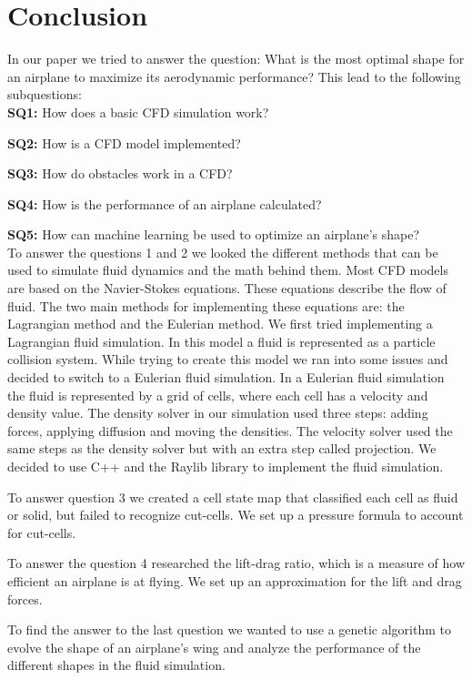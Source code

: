 \documentclass[a4paper,12pt,titlepage]{article}
\begin{document}
\pagebreak
\section{Conclusion}
In our paper we tried to answer the question: What is the most optimal shape for an airplane to maximize its aerodynamic performance?
This lead to the following subquestions:  \\

\textbf{SQ1:} How does a basic CFD simulation work?

\textbf{SQ2:} How is a CFD model implemented?

\textbf{SQ3:} How do obstacles work in a CFD?

\textbf{SQ4:} How is the performance of an airplane calculated?

\textbf{SQ5:} How can machine learning be used to optimize an airplane's shape? \\

To answer the questions 1 and 2 we looked the different methods that can be used to simulate fluid dynamics and the math behind them.
Most CFD models are based on the Navier-Stokes equations. These equations describe the flow of fluid. 
The two main methods for implementing these equations are: the Lagrangian method and the Eulerian method. 
We first tried implementing a Lagrangian fluid simulation. In this model a fluid is represented as a particle collision system.
While trying to create this model we ran into some issues and decided to switch to a Eulerian fluid simulation.
In a Eulerian fluid simulation the fluid is represented by a grid of cells, where each cell has a velocity and density value.
The density solver in our simulation used three steps: adding forces, applying diffusion and moving the densities.
The velocity solver used the same steps as the density solver but with an extra step called projection.
We decided to use C++ and the Raylib library to implement the fluid simulation. 

To answer question 3 we created a cell state map that classified each cell as fluid or solid, but failed to recognize cut-cells.
We set up a pressure formula to account for cut-cells.

To answer the question 4 researched the lift-drag ratio, which is a measure of how efficient an airplane is at flying.
We set up an approximation for the lift and drag forces.

To find the answer to the last question we wanted to use a genetic algorithm to evolve the shape of an airplane's wing 
and analyze the performance of the different shapes in the fluid simulation. 
\end{document}

